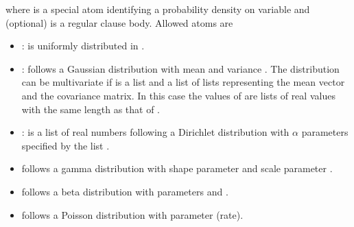 \documentclass[letterpaper,10pt,english]{sphinxmanual}
\begin{document}
\begin{sphinxVerbatim}[commandchars=\\\{\}]
 
\end{sphinxVerbatim}

\sphinxAtStartPar
where  is a special atom identifying a probability density on variable  and 
(optional) is a regular clause body. Allowed  atoms are
\begin{itemize}
\item {} 
\sphinxAtStartPar
{}:  is uniformly distributed in \sphinxcode{\sphinxupquote{{[}L,U{]}}}.

\item {} 
\sphinxAtStartPar
{}:  follows a Gaussian distribution with mean  and variance . The distribution can be multivariate if  is a list and  a list of lists representing the mean vector and the covariance matrix. In this case the values of  are lists of real values with the same length as that of .

\item {} 
\sphinxAtStartPar
{}:  is a list of real numbers following a Dirichlet distribution with \(\alpha\) parameters specified by the list .

\item {} 
\sphinxAtStartPar
{}  follows a gamma distribution with shape parameter  and scale parameter .

\item {} 
\sphinxAtStartPar
{}  follows a beta distribution with parameters  and .

\item {} 
\sphinxAtStartPar
{}  follows a Poisson distribution with parameter  (rate).


\end{itemize}
\end{document}
